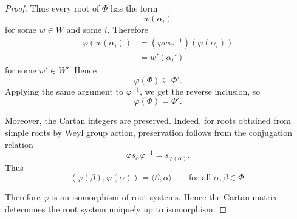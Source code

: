 \begin{proof}
    Thus every root of \(\Phi\) has the form
    \[
        w(\alpha_i)
    \]
    for some \(w\in W\) and some \(i\). Therefore
    \[
    \begin{aligned}
        \varphi(w(\alpha_i))
        &=
        (\varphi w\varphi^{-1})(\varphi(\alpha_i)) \\
        &=
        w'(\alpha_i')
    \end{aligned}
    \]
    for some \(w'\in W'\). Hence
    \[
        \varphi(\Phi)\subseteq \Phi'.
    \]
    Applying the same argument to \(\varphi^{-1}\), we get the reverse inclusion,
    so
    \[
        \varphi(\Phi)=\Phi'.
    \]
    
    Moreover, the Cartan integers are preserved. Indeed, for roots obtained from
    simple roots by Weyl group action, preservation follows from the conjugation
    relation
    \[
        \varphi s_\alpha\varphi^{-1}=s_{\varphi(\alpha)}.
    \]
    Thus
    \[
        \left\langle \varphi(\beta),\varphi(\alpha)\right\rangle
        =
        \langle \beta,\alpha\rangle
        \qquad
        \text{for all }\alpha,\beta\in\Phi.
    \]
    
    Therefore \(\varphi\) is an isomorphism of root systems. Hence the Cartan
    matrix determines the root system uniquely up to isomorphism.
    \end{proof}
